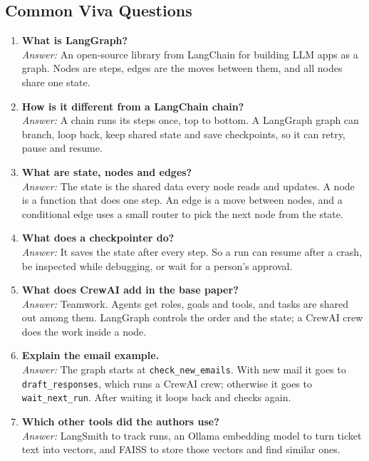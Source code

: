 \documentclass[12pt,a4paper]{report}
\begin{document}
\subsection*{Common Viva Questions}
\begin{enumerate}[leftmargin=*, itemsep=6pt]
    \item \textbf{What is LangGraph?}\\
    \textit{Answer:} An open-source library from LangChain for building LLM apps as a graph. Nodes are steps, edges are the moves between them, and all nodes share one state.

    \item \textbf{How is it different from a LangChain chain?}\\
    \textit{Answer:} A chain runs its steps once, top to bottom. A LangGraph graph can branch, loop back, keep shared state and save checkpoints, so it can retry, pause and resume.

    \item \textbf{What are state, nodes and edges?}\\
    \textit{Answer:} The state is the shared data every node reads and updates. A node is a function that does one step. An edge is a move between nodes, and a conditional edge uses a small router to pick the next node from the state.

    \item \textbf{What does a checkpointer do?}\\
    \textit{Answer:} It saves the state after every step. So a run can resume after a crash, be inspected while debugging, or wait for a person's approval.

    \item \textbf{What does CrewAI add in the base paper?}\\
    \textit{Answer:} Teamwork. Agents get roles, goals and tools, and tasks are shared out among them. LangGraph controls the order and the state; a CrewAI crew does the work inside a node.

    \item \textbf{Explain the email example.}\\
    \textit{Answer:} The graph starts at \texttt{check\_new\_emails}. With new mail it goes to \texttt{draft\_responses}, which runs a CrewAI crew; otherwise it goes to \texttt{wait\_next\_run}. After waiting it loops back and checks again.

    \item \textbf{Which other tools did the authors use?}\\
    \textit{Answer:} LangSmith to track runs, an Ollama embedding model to turn ticket text into vectors, and FAISS to store those vectors and find similar ones.


\end{enumerate}
\end{document}
